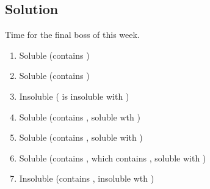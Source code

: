 \documentclass[10pt]{article}
\begin{document}
        \subsection{Solution}
            Time for the final boss of this week.
            \begin{enumerate}[label=\alph*/]
                \item   Soluble (contains )
                \item   Soluble (contains )
                \item   Insoluble ( is insoluble with )
                \item   Soluble (contains , soluble wth )
                \item   Soluble (contains , soluble with )
                \item   Soluble (contains , which contains , soluble with )
                \item   Insoluble (contains , insoluble wth )
            \end{enumerate}

    \pagebreak
    \tableofcontents
\end{document}
